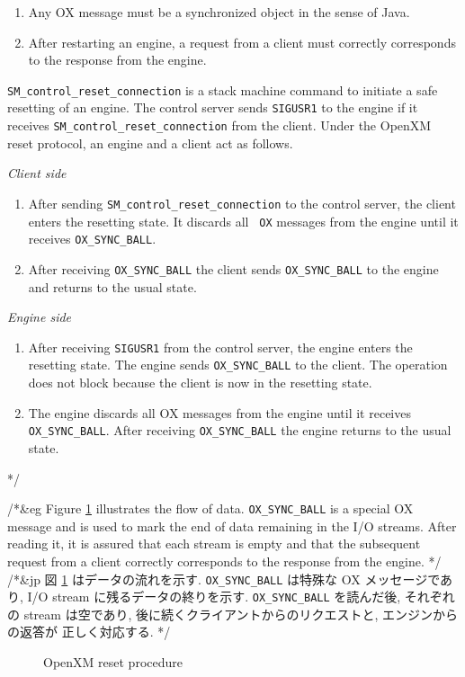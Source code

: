 \begin{enumerate}
\item Any OX message must be a synchronized object in the sense of Java.

\item After restarting an engine, a request from a client 
must correctly corresponds to the response from the engine.
\end{enumerate}

{\tt SM\_control\_reset\_connection} is a stack machine command to
initiate a safe resetting of an engine.
The control server sends {\tt SIGUSR1} to the engine if it receives
{\tt SM\_control\_reset\_connection} from the client.
Under the OpenXM reset protocol, an engine and a client act as follows.

\vskip 2mm
\noindent
{\it Client side} 
\begin{enumerate}
\item After sending {\tt SM\_control\_reset\_connection} to the
control server, the client enters the resetting state. It discards all {\tt
OX} messages from the engine until it receives {\tt OX\_SYNC\_BALL}.
\item After receiving {\tt OX\_SYNC\_BALL} the client sends 
{\tt OX\_SYNC\_BALL} to the engine and returns to the usual state.
\end{enumerate}

\noindent
{\it Engine side}
\begin{enumerate}
\item 
After receiving {\tt SIGUSR1} from the control server,
the engine enters the resetting state.
The engine sends {\tt OX\_SYNC\_BALL} to the client.
The operation does not block because
the client is now in the resetting state.
\item The engine discards all OX messages from the engine until it
receives {\tt OX\_SYNC\_BALL}. After receiving {\tt OX\_SYNC\_BALL} 
the engine returns to the usual state.
\end{enumerate}
*/

/*&eg
Figure \ref{reset} illustrates the flow of data.
{\tt OX\_SYNC\_BALL} is a special OX message and
is used to mark the end of data remaining in the
I/O streams. After reading it, it is assured that each stream is empty
and that the subsequent request from a client correctly 
corresponds to the response from the engine.
*/
/*&jp
図 \ref{reset} はデータの流れを示す. 
{\tt OX\_SYNC\_BALL} は特殊な OX メッセージであり, 
I/O stream に残るデータの終りを示す. 
{\tt OX\_SYNC\_BALL} を読んだ後, それぞれの stream は空であり, 
後に続くクライアントからのリクエストと, エンジンからの返答が
正しく対応する. 
*/
\begin{figure}[htbp]
\epsfxsize=10cm
\begin{center}
\end{center}
\caption{OpenXM reset procedure}
\label{reset}
\end{figure}

